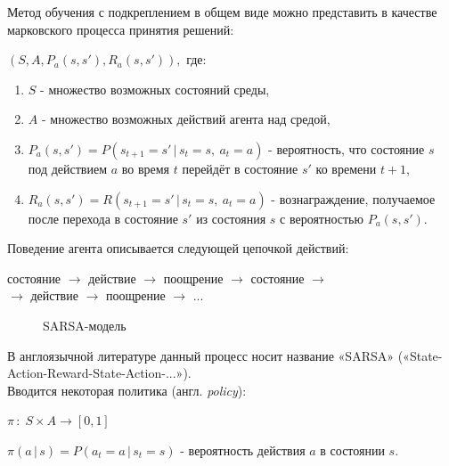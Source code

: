 \documentclass[12pt, a4paper]{report}
\theoremstyle{definition}
\theoremstyle{plain}
\theoremstyle{remark}
\theoremstyle{remark}
\theoremstyle{definition}
\begin{document}
Метод обучения с подкреплением в общем виде можно представить в качестве марковского процесса принятия решений:
\begin{center}
	 $ (S, A, P_a(s, s'), R_a(s, s')),$ где:
\end{center}
\begin{enumerate}
 	\item $S$ - множество возможных состояний среды,
 	\item $A$ - множество возможных действий агента над средой,
 	\item $P_a(s, s') = P(s_{t+1}=s'\,|\,s_t=s,\:a_t=a)$ - вероятность, что состояние $s$ под действием $a$ во время $t$ перейдёт в состояние $s'$ ко времени $t+1$,
 	\item $R_a(s, s') = R(s_{t+1}=s'\,|\,s_t=s,\:a_t=a)$ - вознаграждение, получаемое после перехода в состояние $s'$ из состояния $s$ с вероятностью $P_a(s,s')$.
\end{enumerate}


Поведение агента описывается следующей цепочкой действий:
\begin{center}
состояние $\rightarrow$ действие
$\rightarrow$ поощрение $\rightarrow$ состояние $\rightarrow$ \\
$\rightarrow$ действие $\rightarrow$ поощрение $\rightarrow$ ... 
\end{center}

\begin{figure}[h]
	\caption{SARSA-модель}
\end{figure}

В англоязычной литературе данный процесс носит название «SARSA» («State-Action-Reward-State-Action-...»).\\

Вводится некоторая политика (англ. \textit{policy}):
\begin{center}
	$\pi \, : \; S \times A \rightarrow [0, 1]$

$\pi(a\,|\,s) = P(a_t=a\,|\,s_t=s)$ - вероятность действия $a$ в состоянии $s$.
\end{center}
\end{document}
